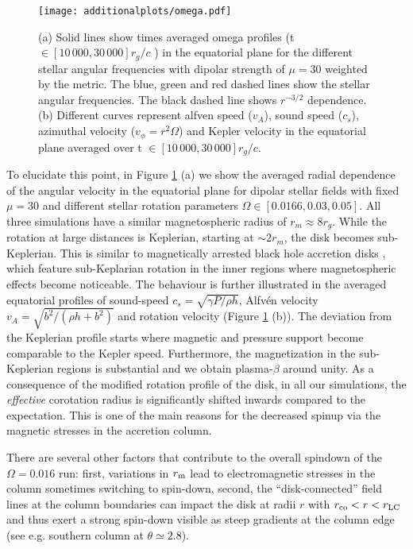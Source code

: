 \documentclass[fleqn,usenatbib]{mnras}
\begin{document}
 \begin{figure}
   \centering
    \texttt{[image: additionalplots/omega.pdf]}%
    \caption{(a) Solid lines show times averaged omega profiles (t $\in [10\, 000, 30\, 000]r_g/c$ ) in the equatorial plane for the different stellar angular frequencies with dipolar strength of $\mu = 30$ weighted by the metric. The blue, green and red dashed lines show the stellar angular frequencies. The black dashed line shows $r^{-3/2}$ dependence. (b) Different curves represent alfven speed ($v_A$), sound speed ($c_s$), azimuthal velocity ($v_{\phi} = r^2\Omega$) and Kepler velocity in the equatorial plane averaged over t $\in [10\, 000, 30\, 000]r_g/c$.}
    \label{fig:omega}
\end{figure}
To elucidate this point, in Figure \ref{fig:omega} (a) we show the averaged radial dependence of the angular velocity in the equatorial plane for dipolar stellar fields with fixed $\mu=30$ and different stellar rotation parameters $\Omega\in[0.0166,0.03,0.05]$.  All three simulations have a similar magnetospheric radius of $r_m\approx 8r_{g}$. While the rotation at large distances is Keplerian, starting at $\sim 2r_m$, the disk becomes sub-Keplerian.  This is similar to magnetically arrested black hole accretion disks \citep{NarayanIgumenshchev2003,2021MNRAS.502.2023P,BegelmanScepiEtAl2021}, which feature  sub-Keplarian rotation in the inner regions where magnetospheric effects become noticeable. 
The behaviour is further illustrated in the averaged equatorial profiles of sound-speed $c_s = \sqrt{\gamma P / \rho h}$, Alfv\'en velocity $v_A = \sqrt{b^2/(\rho h +b^2)}$ and rotation velocity (Figure \ref{fig:omega} (b)). 
The deviation from the Keplerian profile starts where magnetic and pressure support become comparable to the Kepler speed.  Furthermore, the magnetization in the sub-Keplerian regions is substantial and we obtain plasma-$\beta$ around unity.  
As a consequence of the modified rotation profile of the disk, in all our simulations, the \textit{effective} corotation radius is significantly shifted inwards compared to the expectation.  This is one of the main reasons for the decreased spinup via the magnetic stresses in the accretion column.  

There are several other factors that contribute to the overall spindown of the $\Omega=0.016$ run: first, variations in $r_{\rm m}$ lead to electromagnetic stresses in the column sometimes switching to spin-down, second, the ``disk-connected'' field lines at the column boundaries can impact the disk at radii $r$ with $r_{\rm co}<r<r_{\rm LC}$ and thus exert a strong spin-down visible as steep gradients at the column edge (see e.g. southern column at $\theta\simeq2.8$).  
\end{document}
